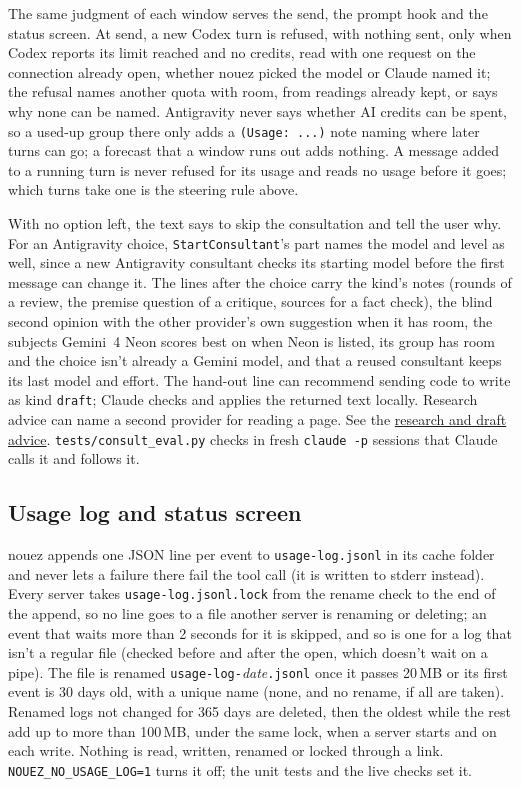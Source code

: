 \documentclass[10pt,a4paper]{article}
\newcommand{\code}[1]{\texttt{#1}}
\begin{document}
The same judgment of each window serves the send, the prompt hook and the status screen. At send, a
new Codex turn is refused, with nothing sent, only when Codex reports its limit reached and no
credits, read with one request on the connection already open, whether nouez picked the model or
Claude named it; the refusal names another quota with room, from readings already kept, or says why none
can be named. Antigravity never says whether AI credits can be spent, so a used-up group there only
adds a \code{(Usage: ...)} note naming where later turns can go; a forecast that a window runs out
adds nothing. A message added to a running turn is never refused for its usage and reads no usage before it
goes; which turns take one is the steering rule above.

With no option left, the text says to skip the consultation and tell the user why. For an
Antigravity choice, \code{StartConsultant}'s part names the model and level as well, since a new
Antigravity consultant checks its starting model before the first message can change it. The lines after
the choice carry the kind's notes (rounds of a review, the premise question of a critique, sources
for a fact check), the blind second opinion with the other provider's own suggestion when it has room, the subjects
Gemini~4 Neon scores best on when Neon is listed, its group has room and the choice isn't already
a Gemini model, and that a reused consultant keeps its last model and effort. The hand-out line can recommend sending code to write as kind \code{draft}; Claude checks and
applies the returned text locally. Research advice can name a second provider for reading a
page. See the \href{https://github.com/jibarix/nouez/blob/v0.31.2/docs/rules.md#rule-research-and-drafts}{research and draft advice}.
\code{tests/consult\_eval.py} checks in fresh \code{claude -p} sessions that Claude calls it and
follows it.

\subsection{Usage log and status screen}
\label{sec:usage}

nouez appends one JSON line per event to \code{usage-log.jsonl} in its cache folder and never lets
a failure there fail the tool call (it is written to stderr instead). Every server takes
\code{usage-log.jsonl.lock} from the rename check to the end of the append, so no line goes to a
file another server is renaming or deleting; an event that waits more than 2 seconds for it is
skipped, and so is one for a log that isn't a regular file (checked before and after the open,
which doesn't wait on a pipe). The file is renamed \code{usage-log-}\textit{date}\code{.jsonl} once it passes 20\,MB or
its first event is 30 days old, with a unique name (none, and no rename, if all are taken).
Renamed logs not changed for 365 days are deleted, then the oldest while the rest add up to more
than 100\,MB, under the same lock, when a server starts and on each write. Nothing is read,
written, renamed or locked through a link.
\code{NOUEZ\_NO\_USAGE\_LOG=1} turns it off; the unit tests and the live checks set it.
\end{document}
